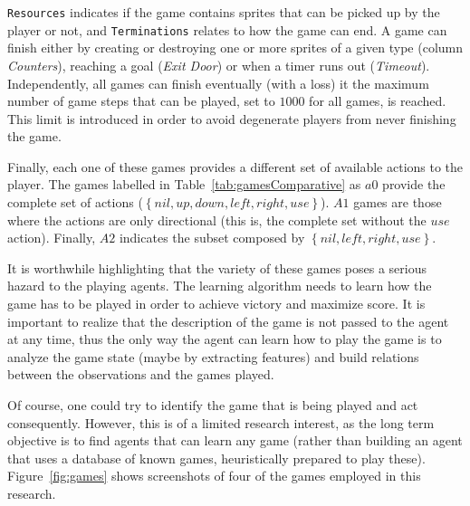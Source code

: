 \documentclass[conference]{IEEEtran}
\begin{document}
\texttt{Resources} indicates if the game contains sprites that can be picked up by the player or not, and \texttt{Terminations} relates to how the game can end. A game can finish either by creating or destroying one or more sprites of a given type (column \textit{Counters}), reaching a goal (\textit{Exit Door}) or when a timer runs out (\textit{Timeout}). Independently, all games can finish eventually (with a loss) it the maximum number of game steps that can be played, set to $1000$ for all games, is reached. This limit is introduced in order to avoid degenerate players from never finishing the game.

Finally, each one of these games provides a different set of available actions to the player. The games labelled in Table~\ref{tab:gamesComparative} as $a0$ provide the complete set of actions ($\left \{ nil, up, down, left, right, use \right \}$). $A1$ games are those where the actions are only directional (this is, the complete set without the $use$ action). Finally, $A2$ indicates the subset composed by $\left \{ nil, left, right, use \right \}$.

It is worthwhile highlighting that the variety of these games poses a serious hazard to the playing agents. The learning algorithm needs to learn how the game has to be played in order to achieve victory and maximize score. It is important to realize that the description of the game is not passed to the agent at any time, thus the only way the agent can learn how to play the game is to analyze the game state (maybe by extracting features) and build relations between the observations and the games played.

Of course, one could try to identify the game that is being played and act consequently. However, this is of a limited research interest, as the long term objective is to find agents that can learn any game (rather than building an agent that uses a database of known games, heuristically prepared to play these).  Figure~\ref{fig:games} shows screenshots of four of the games employed in this research.
\end{document}
